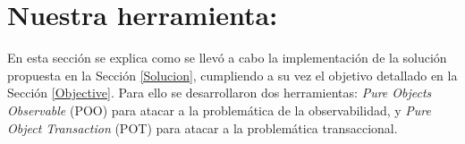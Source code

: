 \section{Nuestra herramienta: }
\label{Implementacion}

	En esta sección se explica como se llevó a cabo la implementación de la solución
	propuesta en la Sección \ref{Solucion}, cumpliendo a su vez el objetivo
	detallado en la Sección \ref{Objective}. Para ello se desarrollaron dos
	herramientas:
	\emph{Pure Objects Observable} (POO) para atacar a la problemática de la
	observabilidad, y \emph{Pure Object Transaction} (POT) para atacar a la
	problemática transaccional.





